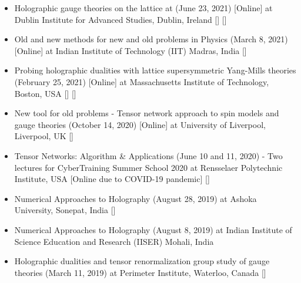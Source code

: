 \begin{itemize}
 \item Holographic gauge theories on the lattice at 
 (June 23, 2021) [Online] at Dublin Institute for Advanced Studies, Dublin, Ireland 
  []  [] 
  \vspace{1mm} 
  
 \item Old and new methods for new and old problems in Physics
 (March 8, 2021) [Online] at Indian Institute of Technology (IIT) Madras, India
  [] 
\vspace{1mm} 
 
 \item Probing holographic dualities with lattice supersymmetric Yang-Mills theories 
 (February 25, 2021) [Online] at Massachusetts Institute of Technology, Boston, USA 
   []  [] 
 \vspace{1mm} 
 
 \item New tool for old problems - Tensor network approach to spin models and gauge theories 
 (October 14, 2020) [Online] at University of Liverpool, Liverpool, UK
  [] 
 \vspace{1mm} 
  
 \item Tensor Networks: Algorithm \& Applications (June 10 and 11, 2020) - Two lectures for 
 CyberTraining Summer School 2020 at Rensselaer Polytechnic Institute, USA [Online due to COVID-19 pandemic]  
   []  
\vspace{1mm} 

 \item Numerical Approaches to Holography (August 28, 2019) at Ashoka University, Sonepat, India [] 
\vspace{1mm} 
 
 \item Numerical Approaches to Holography (August 8, 2019) at Indian Institute of Science Education and Research (IISER) Mohali, India \vspace{1mm} 
 
  \item Holographic dualities and tensor renormalization group study of gauge theories (March 11, 2019) at Perimeter Institute, Waterloo, Canada 
 [] 
\vspace{1mm} 



\end{itemize}
